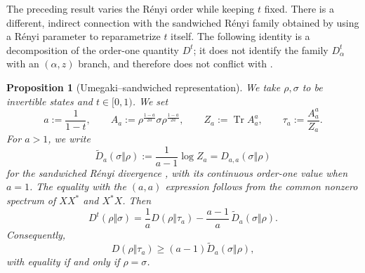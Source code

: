 \documentclass[11pt]{article}
\newtheorem{proposition}[proposition]{Proposition}
\theoremstyle{remark}
\newcommand{\1}{\mathbbm{1}}
\begin{document}
The preceding result varies the R\'enyi order while keeping $t$
fixed.  There is a different, indirect connection with the
sandwiched R\'enyi family obtained by using a R\'enyi parameter to
reparametrize $t$ itself.  The following identity is a decomposition
of the order-one quantity $D^t$; it does not identify the family
$D_\alpha^t$ with an $(\alpha,z)$ branch, and therefore does not
conflict with .

\begin{proposition}[Umegaki--sandwiched representation]
\label{rw:prop:Dt-sandwiched-reformulation}
We take $\rho,\sigma$ to be invertible states and $t\in[0,1)$.  We set
\begin{equation}
 a:=\frac1{1-t},
 \qquad
 A_a:=\rho^{\frac{1-a}{2a}}
       \sigma
       \rho^{\frac{1-a}{2a}},
 \qquad
 Z_a:=\operatorname{Tr}A_a^a,
 \qquad
 \tau_a:=\frac{A_a^a}{Z_a}.
 \label{rw:eq:Dt-sandwiched-escort-state}
\end{equation}
For $a>1$, we write
\begin{equation}
 \widetilde D_a(\sigma\Vert\rho)
 :=\frac1{a-1}\log Z_a
 =D_{a,a}(\sigma\Vert\rho)
 \label{rw:eq:reverse-sandwiched-definition}
\end{equation}
for the sandwiched R\'enyi divergence
\cite[Section~II]{mullerLennert2013quantum,wildeWinterYang2014strong},
with its continuous
order-one value when $a=1$.  The equality with the $(a,a)$
expression follows from the common nonzero spectrum of $XX^*$ and
$X^*X$.  Then
\begin{equation}
 \boxed{
 D^t(\rho\Vert\sigma)
 =\frac1aD(\rho\Vert\tau_a)
  -\frac{a-1}{a}\,
   \widetilde D_a(\sigma\Vert\rho).}
 \label{rw:eq:Dt-sandwiched-reformulation}
\end{equation}
Consequently,
\begin{equation}
 D(\rho\Vert\tau_a)
 \geq(a-1)\widetilde D_a(\sigma\Vert\rho),
 \label{rw:eq:Dt-sandwiched-comparison}
\end{equation}
with equality if and only if $\rho=\sigma$.
\end{proposition}
\end{document}
